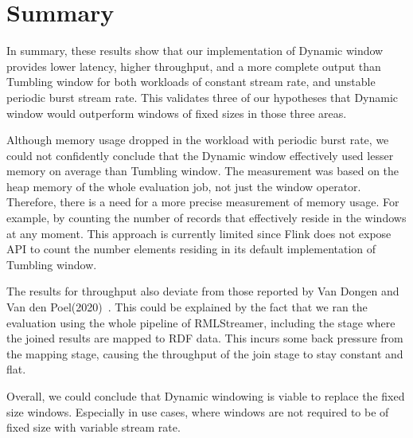 \begin{table}[htbp]
    \centering
\caption{Tumbling window's completeness measurement. 
    The \emph{Expected (triples)} are the number of triples generated by the 
bounded data processing RMLStreamer.}
\label{tab:tumbling_completeness}
\end{table}


\section{Summary}%
\label{sec:Result Summary}

In summary, these results show that our implementation of Dynamic window 
provides lower latency, higher throughput, and a more complete 
output than Tumbling window for both 
workloads of constant stream rate, and unstable periodic burst stream rate.
This validates three of our hypotheses that Dynamic window would outperform 
windows of fixed sizes in those three areas. 

Although memory usage dropped in the workload with periodic burst rate, we 
could not confidently conclude that the Dynamic window effectively used lesser memory
on average than Tumbling window. The measurement was based on the heap memory of the 
whole evaluation job, not just the window operator. Therefore, there is a need for a 
more precise measurement of memory usage. For example, by counting the number of 
records that effectively reside in the windows at any moment. This approach is currently 
limited since Flink does not expose API to count the number elements residing 
in its default implementation of Tumbling window.  

The results for throughput also deviate from those reported by Van Dongen and Van den Poel(2020)~\cite{evalution_of_spe}. 
This could be explained by the fact that we ran the evaluation using the whole pipeline of RMLStreamer, including 
the stage where the joined results are mapped to RDF data. This incurs some back pressure from the mapping stage, 
causing the throughput of the join stage to stay constant and flat.    

Overall, we could conclude that Dynamic windowing is viable to replace the fixed size windows. Especially in use 
cases, where windows are not required to be of fixed size with variable stream rate.  

